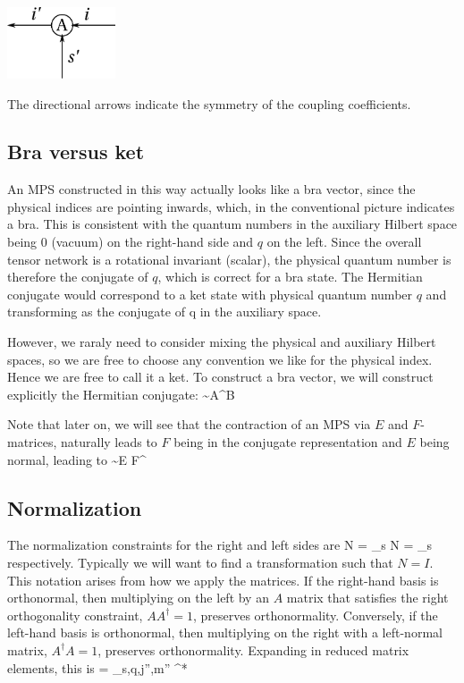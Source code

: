 \documentclass{article}[10pt]
\begin{document}
\begin{centering}
\includegraphics[width=32mm]{AMat.pdf}\par
\end{centering}

The directional arrows indicate the symmetry of the coupling coefficients.

\subsection{Bra versus ket}

An MPS constructed in this way actually looks like a bra vector, since the physical indices
are pointing inwards, which, in the conventional picture indicates a bra. This is consistent with
the quantum numbers in the auxiliary Hilbert space being 0 (vacuum) on the right-hand side
and $q$ on the left. Since the overall tensor network is a rotational invariant (scalar), the
physical quantum number is therefore the conjugate of $q$, which is correct for a bra state. The
Hermitian conjugate would correspond to a ket state with physical quantum number $q$ and
transforming as the conjugate of q in the auxiliary space.

However, we raraly need to consider mixing the physical and auxiliary Hilbert spaces, so we are free
to choose any convention we like for the physical index. Hence we are free to call it a ket.
To construct a bra vector, we will construct explicitly the Hermitian conjugate:
\beq
{} \sim A^\dagger B
\eeq

Note that later on, we will see that the contraction of an MPS via $E$ and $F$-matrices, naturally leads to
$F$ being in the conjugate representation and $E$ being normal, leading to
\beq
{} \sim E F^\dagger
\eeq

\subsection{Normalization}

The normalization constraints for the right and left sides are
\beq
N = \sum_s  
\label{eq:staterightnorm}
\eeq
\beq
N = \sum_s  
\eeq
respectively. Typically we will want to find a transformation such
that $N = I$.
This notation arises from how we apply the matrices. If the right-hand basis
is orthonormal, then multiplying on the left by an $A$ matrix that satisfies the right orthogonality
constraint, $AA^\dagger = 1$, preserves orthonormality.  Conversely, if the left-hand basis
is orthonormal, then multiplying on the right with a left-normal matrix, $A^\dagger A = 1$, 
preserves orthonormality.
Expanding  in reduced matrix elements, this is
\beq
{} = 
\sum_{s,q,j'',m''} 
^*
\eeq
\end{document}
